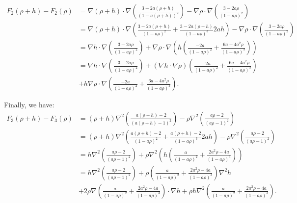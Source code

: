 \documentclass[11pt, a4paper]{article}
\theoremstyle{definition}
\begin{document}
\begin{align*}
	F_2(\rho+h) - F_2(\rho) &= \nabla (\rho +h) \cdot \nabla \left(\frac{3-2a(\rho +h)}{(1-a(\rho+h))^2}\right) -\nabla \rho \cdot \nabla \left(\frac{3-2a\rho}{(1-a\rho)^2}\right) \\
	&= \nabla (\rho +h) \cdot \nabla \left(\frac{3-2a(\rho +h)}{(1-a\rho)^2} + \frac{3-2a(\rho +h)}{(1-a\rho)^3} 2ah \right) -\nabla \rho \cdot \nabla \left(\frac{3-2a\rho}{(1-a\rho)^2}\right)\\
	&=\nabla h \cdot \nabla \left(\frac{3-2a\rho}{(1-a\rho)^2} \right) + \nabla \rho \cdot \nabla \left(h\left(\frac{-2a }{(1-a\rho)^2} + \frac{6a-4a^2  \rho}{(1-a\rho)^3}  \right)\right)\\
	& = \nabla h \cdot \nabla \left( \frac{3-2a\rho}{(1-a\rho)^2} \right) + \left(\nabla h \cdot \nabla \rho \right) \left( \frac{-2a }{(1-a\rho)^2} + \frac{6a-4a^2  \rho}{(1-a\rho)^3}  \right) \\
	&+ h \nabla \rho \cdot \nabla \left(\frac{-2a }{(1-a\rho)^2} + \frac{6a-4a^2  \rho}{(1-a\rho)^3}  \right).
\end{align*}

Finally, we have:
\begin{align*}
	F_3(\rho+h) - F_3(\rho) &= (\rho +h) \nabla^2 \left(\frac{a(\rho +h) -2}{(a(\rho +h) -1)^2}\right) -\rho \nabla^2 \left(\frac{a\rho -2}{(a\rho -1)^2}\right)\\
	&=  (\rho +h) \nabla^2 \left(\frac{a(\rho +h) -2}{(1-a\rho)^2} + \frac{a(\rho +h) -2}{(1-a\rho)^3}2ah \right) -\rho \nabla^2 \left(\frac{a\rho -2}{(a\rho -1)^2}\right)\\
	&= h \nabla^2 \left(\frac{a\rho -2}{(a\rho -1)^2}\right) + \rho \nabla^2  \left(h\left(\frac{a }{(1-a\rho)^2} + \frac{2a^2\rho -4a}{(1-a\rho)^3} \right)\right)\\
	&= h \nabla^2 \left(\frac{a\rho -2}{(a\rho -1)^2}\right) + \rho  \left(\frac{a }{(1-a\rho)^2} + \frac{2a^2\rho -4a}{(1-a\rho)^3} \right)\nabla^2 h \\
	&+ 2 \rho \nabla \left(\frac{a }{(1-a\rho)^2} + \frac{2a^2\rho -4a}{(1-a\rho)^3} \right) \cdot \nabla h + \rho h \nabla^2  \left(\frac{a }{(1-a\rho)^2} + \frac{2a^2\rho -4a}{(1-a\rho)^3} \right).\\
\end{align*}
\end{document}
